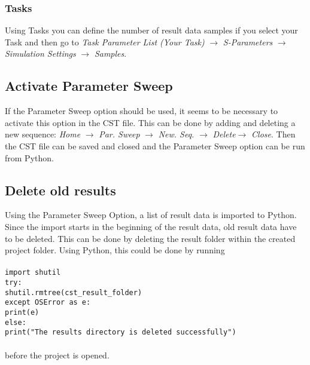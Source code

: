 \documentclass[12pt,accentcolor=tud2b, colorback, openany]{tudreport}
\begin{document}
	\subsubsection{Tasks} 
	Using Tasks you can define the number of result data samples if you select your Task and then go to \textit{Task Parameter List (Your Task)} $\rightarrow$ \textit{S-Parameters} $\rightarrow$ \textit{Simulation Settings} $\rightarrow$ \textit{Samples}. 
	
	\subsection{Activate Parameter Sweep}
	If the Parameter Sweep option should be used, it seems to be necessary to activate this option in the CST file. This can be done by adding and deleting a new sequence: \textit{Home} $\rightarrow$ \textit{Par. Sweep} $\rightarrow$ \textit{New. Seq.} $\rightarrow$ \textit{Delete}$\rightarrow$ \textit{Close}. Then the CST file can be saved and closed and the Parameter Sweep option can be run from Python.
	
	\subsection{Delete old results}
	Using the Parameter Sweep Option, a list of result data is imported to Python. Since the import starts in the beginning of the result data, old result data have to be deleted. This can be done by deleting the result folder within the created project folder. Using Python, this could be done by running\\
	\\
	\texttt{import shutil}\\
	\texttt{try:}\\
	\hspace*{0.3cm}\texttt{shutil.rmtree(cst\_result\_folder)}\\
	\texttt{except OSError as e:}\\
	\hspace*{0.3cm}\texttt{print(e)}\\
	\texttt{else:}\\
	\hspace*{0.3cm}\texttt{print("The results directory is deleted successfully")}\\
	\\
	before the project is opened.
	
\end{document}
